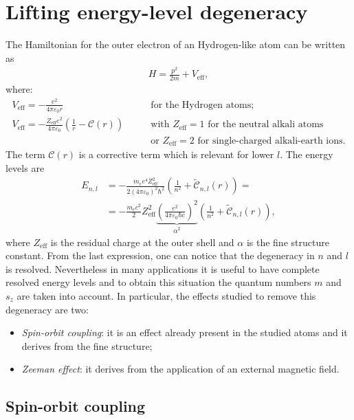 \section{Lifting energy-level degeneracy}

The Hamiltonian for the outer electron of an Hydrogen-like atom can be written as
\begin{align*}
    H = \frac{p^2}{2m} + V_\text{eff}, 
\end{align*}
where:
\begin{align*}
        V_\text{eff} = - \frac{e^2}{4 \pi \varepsilon_0 r} \qquad &\text{for the Hydrogen atoms;} \\
        V_\text{eff} = - \frac{Z_\text{eff} e^2}{4 \pi \varepsilon_0 }\left( \frac{1}{r} - \mathcal{C}(r)\right) 
    \qquad &\text{with $Z_\text{eff} = 1$ for the neutral alkali atoms} \\
    &\text{or $Z_\text{eff} = 2$ for single-charged alkali-earth ions.}
\end{align*}
The term $\mathcal{C}(r)$ is a corrective term which is relevant for lower $l$. 
The energy levels are 
\begin{align*}
    E_{n,l} &= - \frac{m_e e^4 Z_\text{eff}^2}{2 (4 \pi \varepsilon_0)^2 \hbar^2} \left( \frac{1}{n^2} + \tilde{\mathcal{C}}_{n,l}(r)\right) = \\
    & = -\frac{m_e c^2}{2} Z_\text{eff}^2 \underbrace{\left( \frac{e^2}{4 \pi \varepsilon_0 \hbar c}\right)^2}_{\alpha^2} \left( \frac{1}{n^2} +  \tilde{\mathcal{C}}_{n,l}(r) \right),
\end{align*}
where $Z_\text{eff}$ is the residual charge at the outer shell and $\alpha$ is the fine structure constant. From the last expression, one can notice that the degeneracy in $n$ and $l$ is resolved. Nevertheless in many applications it is useful to have complete resolved energy levels and to obtain this situation the quantum numbers $m$ and $s_z$ are taken into account. In particular, the effects studied to remove this degeneracy are two:
\begin{itemize}
    \item \textit{Spin-orbit coupling}: it is an effect already present in the studied atoms and it derives from the fine structure; 
    \item \textit{Zeeman effect}: it derives from the application of an external magnetic field. 
\end{itemize}


\subsection{Spin-orbit coupling}

